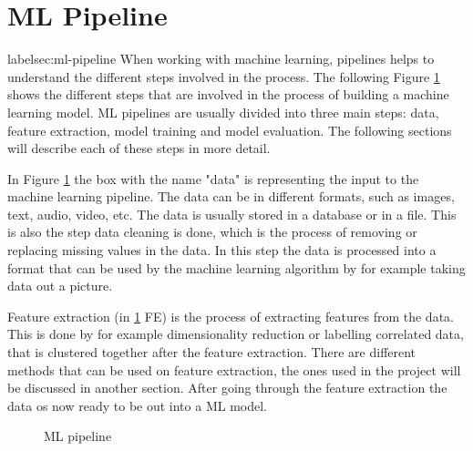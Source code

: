 \section{ML Pipeline}label{sec:ml-pipeline}
When working with machine learning, pipelines helps to understand the different steps involved in the process. The following Figure \ref{fig:ml-pipeline} shows the different steps that are involved in the process of building a machine learning model.
ML pipelines are usually divided into three main steps: data, feature extraction, model training and model evaluation. The following sections will describe each of these steps in more detail.

In Figure \ref{fig:ml-pipeline} the box with the name "data" is representing the input to the machine learning pipeline. The data can be in different formats, such as images, text, audio, video, etc. The data is usually stored in a database or in a file. This is also the step data cleaning is done, which is the process of removing or replacing missing values in the data. In this step the data is processed into a format that can be used by the machine learning algorithm by for example taking data out a picture.

Feature extraction (in \ref{fig:ml-pipeline} FE) is the process of extracting features from the data. This is done by for example dimensionality reduction or labelling correlated data, that is clustered together after the feature extraction. There are different methods that can be used on feature extraction, the ones used in the project will be discussed in another section. After going through the feature extraction the data os now ready to be out into a ML  model.


\begin{figure}
  \centering
  \caption{ML pipeline}
  \label{fig:ml-pipeline}
\end{figure}


